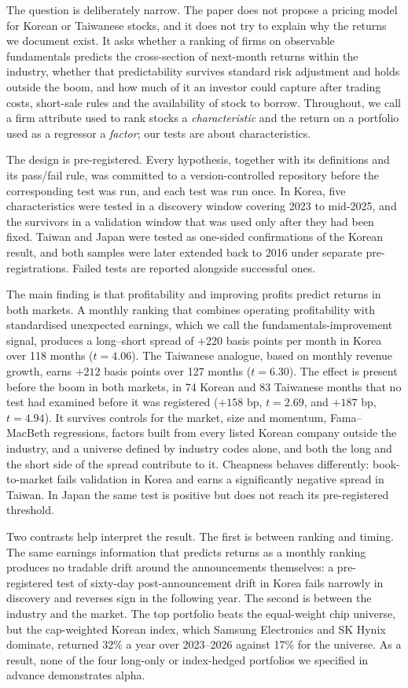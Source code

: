 \documentclass[12pt,a4paper]{article}
\begin{document}
The question is deliberately narrow. The paper does not propose a pricing model for Korean or Taiwanese stocks, and it
does not try to explain why the returns we document exist. It asks whether a ranking of firms on observable
fundamentals predicts the cross-section of next-month returns within the industry, whether that predictability
survives standard risk adjustment and holds outside the boom, and how much of it an investor could capture after
trading costs, short-sale rules and the availability of stock to borrow. Throughout, we call a firm attribute used to
rank stocks a \emph{characteristic} and the return on a portfolio used as a regressor a \emph{factor}; our tests are
about characteristics.

The design is pre-registered. Every hypothesis, together with its definitions and its pass/fail rule, was committed to
a version-controlled repository before the corresponding test was run, and each test was run once. In Korea, five
characteristics were tested in a discovery window covering 2023 to mid-2025, and the survivors in a validation window
that was used only after they had been fixed. Taiwan and Japan were tested as one-sided confirmations of the Korean
result, and both samples were later extended back to 2016 under separate pre-registrations. Failed tests are reported
alongside successful ones.

The main finding is that profitability and improving profits predict returns in both markets. A monthly ranking that
combines operating profitability with standardised unexpected earnings, which we call the fundamentals-improvement
signal, produces a long--short spread of $+220$ basis points per month in Korea over 118 months ($t=4.06$). The
Taiwanese analogue, based on monthly revenue growth, earns $+212$ basis points over 127 months ($t=6.30$). The effect
is present before the boom in both markets, in 74 Korean and 83 Taiwanese months that no test had examined before it
was registered ($+158$ bp, $t=2.69$, and $+187$ bp, $t=4.94$). It survives controls for the market, size and
momentum, Fama--MacBeth regressions, factors built from every listed Korean company outside the industry, and a
universe defined by industry codes alone, and both the long and the short side of the spread contribute to it.
Cheapness behaves differently: book-to-market fails validation in Korea and earns a significantly negative spread in
Taiwan. In Japan the same test is positive but does not reach its pre-registered threshold.

Two contrasts help interpret the result. The first is between ranking and timing. The same earnings information that
predicts returns as a monthly ranking produces no tradable drift around the announcements themselves: a pre-registered
test of sixty-day post-announcement drift in Korea fails narrowly in discovery and reverses sign in the following
year. The second is between the industry and the market. The top portfolio beats the equal-weight chip universe, but
the cap-weighted Korean index, which Samsung Electronics and SK Hynix dominate, returned 32\% a year over 2023--2026
against 17\% for the universe. As a result, none of the four long-only or index-hedged portfolios we specified in
advance demonstrates alpha.
\end{document}
